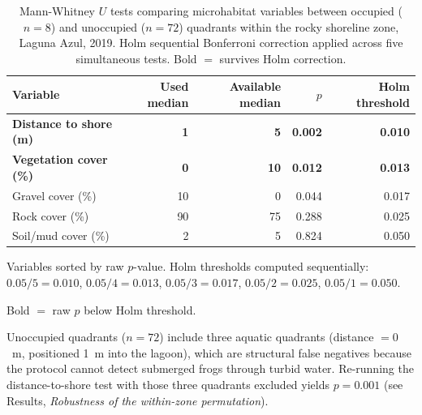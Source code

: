\begin{table}[H]
\centering
\caption{\label{tab-mw}Mann-Whitney $U$ tests comparing microhabitat variables between
occupied ($n = 8$) and unoccupied ($n = 72$) quadrants within the rocky
shoreline zone, Laguna Azul, 2019. Holm sequential Bonferroni correction
applied across five simultaneous tests. Bold $=$ survives Holm correction.}
\begin{threeparttable}
\begin{tabular}{lrrrr}
\toprule
Variable & Used median & Available median & $p$ & Holm threshold \\
\midrule
\textbf{Distance to shore (m)} & \textbf{1} & \textbf{5} &
  \textbf{0.002} & \textbf{0.010} \\
\textbf{Vegetation cover (\%)} & \textbf{0} & \textbf{10} &
  \textbf{0.012} & \textbf{0.013} \\
Gravel cover (\%)              &  10 &  0 & 0.044 & 0.017 \\
Rock cover (\%)                &  90 & 75 & 0.288 & 0.025 \\
Soil/mud cover (\%)            &   2 &  5 & 0.824 & 0.050 \\
\bottomrule
\end{tabular}
\begin{tablenotes}[flushleft]\footnotesize
  \item Variables sorted by raw $p$-value. Holm thresholds computed
    sequentially: $0.05/5 = 0.010$, $0.05/4 = 0.013$, $0.05/3 = 0.017$,
    $0.05/2 = 0.025$, $0.05/1 = 0.050$.
  \item Bold $=$ raw $p$ below Holm threshold.
  \item Unoccupied quadrants ($n = 72$) include three aquatic quadrants
    (distance $= 0$~m, positioned 1~m into the lagoon), which are
    structural false negatives because the protocol cannot detect
    submerged frogs through turbid water. Re-running the distance-to-shore
    test with those three quadrants excluded yields $p = 0.001$ (see Results,
    \textit{Robustness of the within-zone permutation}).
\end{tablenotes}
\end{threeparttable}
\end{table}
